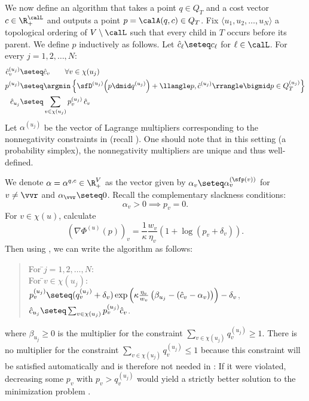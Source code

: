 We now define an algorithm that takes a point $q \in Q_T$ and a cost vector $c \in \R_+^{\calL}$ and outputs
a point $p = \calA(q,c)\in Q_T$.
Fix $\langle u_1,u_2,\ldots, u_N\rangle$ a topological ordering of $V \setminus \calL$
such that every child in $T$ occurs before its parent.
We define $p$ inductively as follows.
Let $\hat{c}_{\ell} \seteq c_{\ell}$ for $\ell \in \calL$.
For every $j=1,2,\ldots,N$:
\begin{align}
\hat{c}^{(u_j)}_v &\seteq \hat{c}_v \qquad \forall v \in \chi(u_j) \label{eq:hatc}\\
p^{(u_j)} &\seteq \argmin \left\{ \sfD^{(u_j)}\!\left(p \dmid q^{(u_j)}\right) + \llangle p, \hat{c}^{(u_j)} \rrangle \bigmid 
p \in Q^{(u_j)}_T\right\} \label{eq:locp} \\
\hat{c}_{u_j} &\seteq \sum_{v \in \chi(u_j)} p^{(u_j)}_v\,\hat{c}_v \label{eq:hatc2}
\end{align}
Let $\alpha^{(u_j)}$ be
the vector of Lagrange multipliers corresponding to the nonnegativity constraints in 
(recall ).
One should note that in this setting (a probability simplex), the nonnegativity multipliers are unique
and thus well-defined.

We denote $\alpha = \alpha^{q,c} \in \R_+^{V}$ as the vector given by $\alpha_v \seteq \alpha^{(\sfp(v))}_v$ for $v \neq \vvr$
and $\alpha_{\vvr} \seteq 0$.
Recall the complementary slackness conditions:
\begin{equation}\label{eq:posmult}
\alpha_v > 0 \implies p_v = 0.
\end{equation}
For $v \in \chi(u)$, calculate
\[
\left(\nabla \Phi^{(u)}(p)\right)_v = \frac{1}{\kappa} \frac{w_v}{\eta_v} \left(1+\log(p_v+\delta_v)\right).
\]
Then using , we can write the algorithm as follows:
\begin{quote}
	\begin{tabbing}
		For \=$j=1,2,\ldots,N$: \\[0.1cm]
		\>For \=$v \in \chi(u_j)$: \\[0.1cm]
		\>\>$p^{(u_j)}_v \seteq (q^{(u_j)}_v+\delta_v) \exp\left(\kappa \frac{\eta_v}{w_v} \left(\beta_{u_j} - (\hat{c}_v - \alpha_v)\right)\right)- \delta_v$, \\[0.1cm]
		\>$\hat{c}_{u_j} \seteq \sum_{v \in \chi(u_j)} p_v^{(u_j)} \hat{c}_v$.
	\end{tabbing}
\end{quote}
where $\beta_{u_j}\ge 0$ is the multiplier for the constraint $\sum_{v \in \chi(u_j)} q^{(u_j)}_v \geq 1$. There is no multiplier for the constraint $\sum_{v \in \chi(u_j)} q_v^{(u_j)} \leq 1$ because this constraint will be satisfied automatically and is therefore not needed in : If it were violated, decreasing some $p_v$ with $p_v>q_v^{(u_j)}$ would yield a strictly better solution to the minimization problem .

